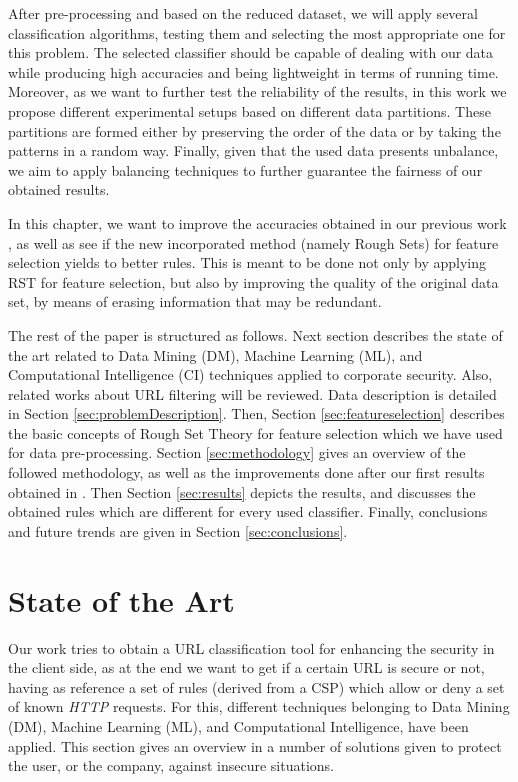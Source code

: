 \documentclass{llncs}
\begin{document}
After pre-processing and based on the reduced dataset, we will apply several classification algorithms, 
testing them and selecting the most appropriate one for this problem. The selected classifier should be capable 
of dealing with our data while producing high accuracies and
being lightweight in terms of running time. Moreover, as we want to further test the reliability of the results, 
in this work we propose different experimental setups based on different data
partitions. These partitions are formed either by preserving the order of the data or by taking the patterns in 
a random way. Finally, given that the used data presents unbalance, we aim to apply balancing 
techniques \cite{imbalance_techniques_02} to further guarantee the fairness of our obtained results.

In this chapter, we want to improve the accuracies obtained in our previous work \cite{ECTA}, 
as well as see if the new incorporated method (namely Rough Sets) for feature selection yields to better rules. 
This is meant to be done not only by applying RST for feature selection, but also by improving the quality of the 
original data set, by means of erasing information that may be redundant.

The rest of the paper is structured as follows. Next section describes the state of the art related 
to Data Mining (DM), Machine Learning (ML), and Computational Intelligence (CI) techniques applied 
to corporate security. Also, related works about URL filtering will be reviewed. Data  description is 
detailed in Section \ref{sec:problemDescription}. Then, Section \ref{sec:featureselection} describes the  
basic concepts of Rough Set Theory for feature selection which we  have used for data pre-processing. 
Section \ref{sec:methodology} gives an overview of the  followed methodology, as well as the improvements 
done after our  first results obtained in \cite{ECTA}. Then Section \ref{sec:results} depicts the results, and discusses the  obtained rules which are different for every used classifier. Finally, conclusions and future trends are given in Section \ref{sec:conclusions}.
 
%
\section{State of the Art}
\label{sec:stateofart}

\noindent Our work tries to obtain a URL classification tool for
enhancing the security in the client side, as at the end we want to
get if a certain URL is secure or not, having as reference a set of
rules (derived from a CSP) which allow or deny a set of known
\textit{HTTP} requests. For this, different techniques belonging to
Data Mining (DM), Machine Learning (ML), and Computational
Intelligence, have been applied. This section gives  an overview in a
number of solutions given to protect the user, or the company, against
insecure situations.  
                      
\end{document}
